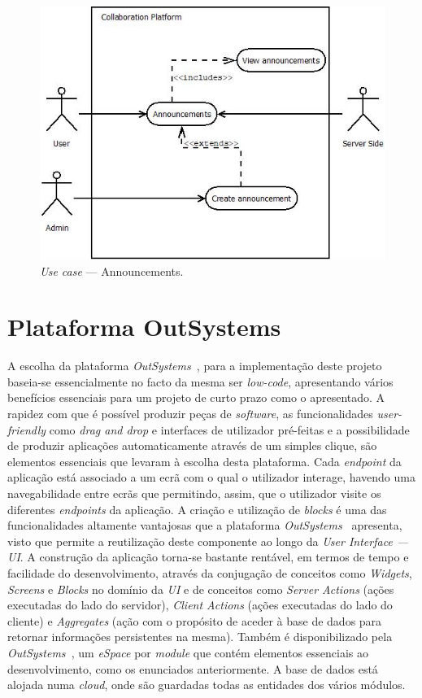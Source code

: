 \begin{figure}[H]
    \centering
    \includegraphics[scale=0.6]{figures/Announcements use case.jpeg}
    \caption{\textit{Use case} --- Announcements.}\label{fig:uc:announcements}
\end{figure}

\section{Plataforma OutSystems}\label{sec:plataformaOutSystems}

A escolha da plataforma \textit{OutSystems~\cite{outsystems}}, para a implementação deste projeto baseia-se essencialmente no facto da mesma ser \textit{low-code},
apresentando vários benefícios essenciais para um projeto de curto prazo como o apresentado. A rapidez
com que é possível produzir peças de \textit{software}, as funcionalidades \textit{user-friendly} como \textit{drag and drop} e 
interfaces de utilizador pré-feitas e a possibilidade de produzir aplicações automaticamente através de
um simples clique, são elementos essenciais que levaram à escolha desta plataforma. 
Cada \textit{endpoint} da aplicação está associado a um ecrã com o qual o utilizador interage, havendo uma navegabilidade entre ecrãs que permitindo, assim,
 que o utilizador visite os diferentes \textit{endpoints} da aplicação.
A criação e utilização de \textit{blocks} é uma das funcionalidades altamente vantajosas que a plataforma \textit{OutSystems~\cite{outsystems}} apresenta, 
visto que permite a reutilização deste componente ao longo da \textit{User Interface --- UI}.
A construção da aplicação torna-se bastante rentável, em termos de tempo e facilidade do desenvolvimento, 
através da conjugação de conceitos como \textit{Widgets}, \textit{Screens} e \textit{Blocks} no domínio da  \textit{UI} 
e de conceitos como \textit{Server Actions} (ações executadas do lado do servidor), \textit{Client Actions} (ações executadas do lado do cliente) 
e \textit{Aggregates} (ação com o propósito de aceder à base de dados para retornar informações persistentes na mesma).
Também é disponibilizado pela \textit{OutSystems~\cite{outsystems}}, um \textit{eSpace} por \textit{module} que contém elementos essenciais 
ao desenvolvimento, como os enunciados anteriormente.
A base de dados está alojada numa \textit{cloud}, onde são guardadas todas as entidades dos vários módulos.
